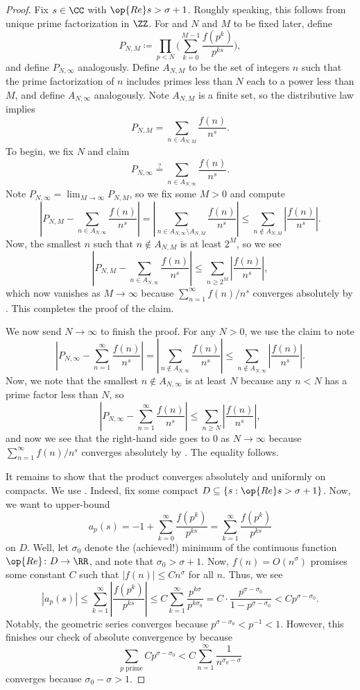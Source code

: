 \documentclass[../notes.tex]{subfiles}
\begin{document}
\begin{proof}
	Fix $s\in\CC$ with $\op{Re}s>\sigma+1$. Roughly speaking, this follows from unique prime factorization in $\ZZ$. For and $N$ and $M$ to be fixed later, define
	\[P_{N,M}\coloneqq\prod_{p<N}\Bigg(\sum_{k=0}^{M-1}\frac{f\left(p^k\right)}{p^{ks}}\Bigg),\]
	and define $P_{N,\infty}$ analogously. Define $A_{N,M}$ to be the set of integers $n$ such that the prime factorization of $n$ includes primes less than $N$ each to a power less than $M$, and define $A_{N,\infty}$ analogously. Note $A_{N,M}$ is a finite set, so the distributive law implies
	\[P_{N,M}=\sum_{n\in A_{N,M}}\frac{f(n)}{n^s}.\]
	To begin, we fix $N$ and claim
	\[P_{N,\infty}\stackrel?=\sum_{n\in A_{N,\infty}}\frac{f(n)}{n^s}.\]
	Note $P_{N,\infty}=\lim_{M\to\infty}P_{N,M}$, so we fix some $M>0$ and compute
	\[\left|P_{N,M}-\sum_{n\in A_{N,\infty}}\frac{f(n)}{n^s}\right|=\left|\sum_{n\in A_{N,\infty}\setminus A_{N,M}}\frac{f(n)}{n^s}\right|\le\sum_{n\notin A_{N,M}}\left|\frac{f(n)}{n^s}\right|.\]
	Now, the smallest $n$ such that $n\notin A_{N,M}$ is at least $2^M$, so we see
	\[\left|P_{N,M}-\sum_{n\in A_{N,\infty}}\frac{f(n)}{n^s}\right|\le\sum_{n\ge 2^M}\left|\frac{f(n)}{n^s}\right|,\]
	which now vanishes as $M\to\infty$ because $\sum_{n=1}^\infty f(n)/n^s$ converges absolutely by . This completes the proof of the claim.

	We now send $N\to\infty$ to finish the proof. For any $N>0$, we use the claim to note
	\[\left|P_{N,\infty}-\sum_{n=1}^\infty\frac{f(n)}{n^s}\right|=\left|\sum_{n\notin A_{N,\infty}}\frac{f(n)}{n^s}\right|\le\sum_{n\notin A_{N,\infty}}\left|\frac{f(n)}{n^s}\right|.\]
	Now, we note that the smallest $n\notin A_{N,\infty}$ is at least $N$ because any $n<N$ has a prime factor less than $N$, so
	\[\left|P_{N,\infty}-\sum_{n=1}^\infty\frac{f(n)}{n^s}\right|\le\sum_{n\ge N}\left|\frac{f(n)}{n^s}\right|,\]
	and now we see that the right-hand side goes to $0$ as $N\to\infty$ because $\sum_{n=1}^\infty f(n)/n^s$ converges absolutely by . The equality follows.

	It remains to show that the product converges absolutely and uniformly on compacts. We use . Indeed, fix some compact $D\subseteq\{s:\op{Re}s>\sigma+1\}$. Now, we want to upper-bound
	\[a_p(s)=-1+\sum_{k=0}^\infty\frac{f\left(p^k\right)}{p^{ks}}=\sum_{k=1}^\infty\frac{f\left(p^k\right)}{p^{ks}}\]
	on $D$. Well, let $\sigma_0$ denote the (achieved!) minimum of the continuous function $\op{Re}\colon D\to\RR$, and note that $\sigma_0>\sigma+1$. Now, $f(n)=O\left(n^\sigma\right)$ promises some constant $C$ such that $|f(n)|\le Cn^\sigma$ for all $n$. Thus, we see
	\[|a_p(s)|\le\sum_{k=1}^\infty\left|\frac{f\left(p^k\right)}{p^{ks}}\right|\le C\sum_{k=1}^\infty\frac{p^{k\sigma}}{p^{k\sigma_0}}=C\cdot\frac{p^{\sigma-\sigma_0}}{1-p^{\sigma-\sigma_0}}<Cp^{\sigma-\sigma_0}.\]
	Notably, the geometric series converges because $p^{\sigma-\sigma_0}<p^{-1}<1$. However, this finishes our check of absolute convergence by  because
	\[\sum_{p\text{ prime}}Cp^{\sigma-\sigma_0}<C\sum_{n=1}^\infty\frac1{n^{\sigma_0-\sigma}}\]
	converges because $\sigma_0-\sigma>1$.
\end{proof}
\end{document}
